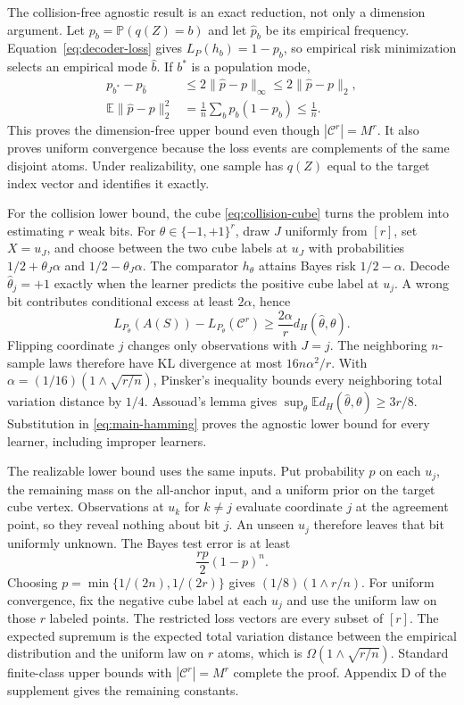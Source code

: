 \documentclass[twoside]{article}
\newcommand{\E}{\mathbb E}
\newcommand{\Pp}{\mathbb P}
\newcommand{\C}{\mathcal C}
\begin{document}
The collision-free agnostic result is an exact reduction, not only a dimension argument. Let $p_b=\Pp(q(Z)=b)$ and let $\widehat p_b$ be its empirical frequency. Equation~\eqref{eq:decoder-loss} gives $L_P(h_b)=1-p_b$, so empirical risk minimization selects an empirical mode $\widehat b$. If $b^*$ is a population mode,
\begin{align*}
 p_{b^*}-p_{\widehat b}
 &\leq2\|\widehat p-p\|_\infty
 \leq2\|\widehat p-p\|_2,\\
 \E\|\widehat p-p\|_2^2
 &=\frac1n\sum_b p_b(1-p_b)\leq\frac1n.
\end{align*}
This proves the dimension-free upper bound even though $|\C^r|=M^r$. It also proves uniform convergence because the loss events are complements of the same disjoint atoms. Under realizability, one sample has $q(Z)$ equal to the target index vector and identifies it exactly.

For the collision lower bound, the cube \eqref{eq:collision-cube} turns the problem into estimating $r$ weak bits. For $\theta\in\{-1,+1\}^r$, draw $J$ uniformly from $[r]$, set $X=u_J$, and choose between the two cube labels at $u_J$ with probabilities $1/2+\theta_J\alpha$ and $1/2-\theta_J\alpha$. The comparator $h_\theta$ attains Bayes risk $1/2-\alpha$. Decode $\widehat\theta_j=+1$ exactly when the learner predicts the positive cube label at $u_j$. A wrong bit contributes conditional excess at least $2\alpha$, hence
\begin{equation}
 L_{P_\theta}(A(S))-L_{P_\theta}(\C^r)
 \geq \frac{2\alpha}{r}d_H(\widehat\theta,\theta).
 \label{eq:main-hamming}
\end{equation}
Flipping coordinate $j$ changes only observations with $J=j$. The neighboring $n$-sample laws therefore have KL divergence at most $16n\alpha^2/r$. With $\alpha=(1/16)(1\wedge\sqrt{r/n})$, Pinsker's inequality bounds every neighboring total variation distance by $1/4$. Assouad's lemma \citep{tsybakov2009} gives $\sup_\theta\E d_H(\widehat\theta,\theta)\geq3r/8$. Substitution in \eqref{eq:main-hamming} proves the agnostic lower bound for every learner, including improper learners.

The realizable lower bound uses the same inputs. Put probability $p$ on each $u_j$, the remaining mass on the all-anchor input, and a uniform prior on the target cube vertex. Observations at $u_k$ for $k\neq j$ evaluate coordinate $j$ at the agreement point, so they reveal nothing about bit $j$. An unseen $u_j$ therefore leaves that bit uniformly unknown. The Bayes test error is at least \[ \frac{rp}{2}(1-p)^n. \] Choosing $p=\min\{1/(2n),1/(2r)\}$ gives $(1/8)(1\wedge r/n)$. For uniform convergence, fix the negative cube label at each $u_j$ and use the uniform law on those $r$ labeled points. The restricted loss vectors are every subset of $[r]$. The expected supremum is the expected total variation distance between the empirical distribution and the uniform law on $r$ atoms, which is $\Omega(1\wedge\sqrt{r/n})$. Standard finite-class upper bounds \citep{devroye1996} with $|\C^r|=M^r$ complete the proof. Appendix D of the supplement gives the remaining constants.
\end{document}
